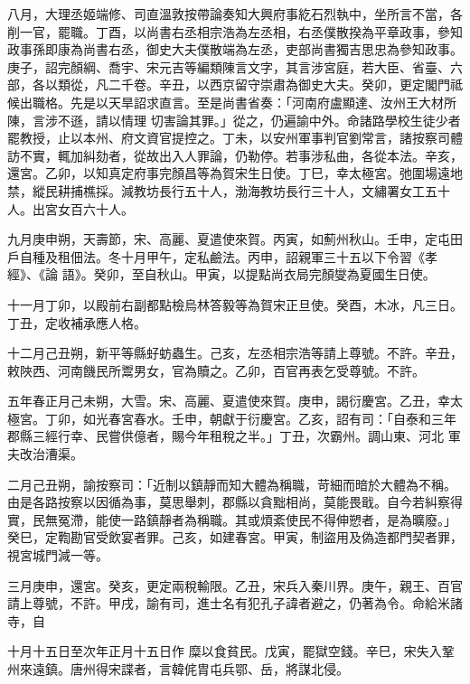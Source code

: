 \begin{pinyinscope}
 八月，大理丞姬端修、司直溫敦按帶論奏知大興府事紇石烈執中，坐所言不當，各削一官，罷職。丁酉，以尚書右丞相宗浩為左丞相，右丞僕散揆為平章政事，參知政事孫即康為尚書右丞，御史大夫僕散端為左丞，吏部尚書獨吉思忠為參知政事。庚子，詔完顏綱、喬宇、宋元吉等編類陳言文字，其言涉宮庭，若大臣、省臺、六部，各以類從，凡二千卷。辛丑，以西京留守崇肅為御史大夫。癸卯，更定閣門祗候出職格。先是以天旱詔求直言。至是尚書省奏：「河南府盧顯達、汝州王大材所陳，言涉不遜，請以情理
 切害論其罪。」從之，仍遍諭中外。命諸路學校生徒少者罷教授，止以本州、府文資官提控之。丁未，以安州軍事判官劉常言，諸按察司體訪不實，輒加糾劾者，從故出入人罪論，仍勒停。若事涉私曲，各從本法。辛亥，還宮。乙卯，以知真定府事完顏昌等為賀宋生日使。丁巳，幸太極宮。弛圍場遠地禁，縱民耕捕樵採。減教坊長行五十人，渤海教坊長行三十人，文繡署女工五十人。出宮女百六十人。



 九月庚申朔，天壽節，宋、高麗、夏遣使來賀。丙寅，如薊州秋山。壬申，定屯田戶自種及租佃法。冬十月甲午，定私鹼法。丙申，詔親軍三十五以下令習《孝經》、《論
 語》。癸卯，至自秋山。甲寅，以提點尚衣局完顏燮為夏國生日使。



 十一月丁卯，以殿前右副都點檢烏林答毅等為賀宋正旦使。癸酉，木冰，凡三日。丁丑，定收補承應人格。



 十二月己丑朔，新平等縣虸蚄蟲生。己亥，左丞相宗浩等請上尊號。不許。辛丑，敕陜西、河南饑民所鬻男女，官為贖之。乙卯，百官再表乞受尊號。不許。



 五年春正月己未朔，大雪。宋、高麗、夏遣使來賀。庚申，謁衍慶宮。乙丑，幸太極宮。丁卯，如光春宮春水。壬申，朝獻于衍慶宮。乙亥，詔有司：「自泰和三年郡縣三經行幸、民嘗供億者，賜今年租稅之半。」丁丑，次霸州。調山東、河北
 軍夫改治漕渠。



 二月己丑朔，諭按察司：「近制以鎮靜而知大體為稱職，苛細而暗於大體為不稱。由是各路按察以因循為事，莫思舉刺，郡縣以貪黜相尚，莫能畏戢。自今若糾察得實，民無冤滯，能使一路鎮靜者為稱職。其或煩紊使民不得伸愬者，是為曠廢。」癸巳，定鞫勘官受飲宴者罪。己亥，如建春宮。甲寅，制盜用及偽造都門契者罪，視宮城門減一等。



 三月庚申，還宮。癸亥，更定兩稅輸限。乙丑，宋兵入秦川界。庚午，親王、百官請上尊號，不許。甲戌，諭有司，進士名有犯孔子諱者避之，仍著為令。命給米諸寺，自



 十月十五日至次年正月十五日作
 糜以食貧民。戊寅，罷獄空錢。辛巳，宋失入鞏州來遠鎮。唐州得宋諜者，言韓侂胄屯兵鄂、岳，將謀北侵。




\end{pinyinscope}
